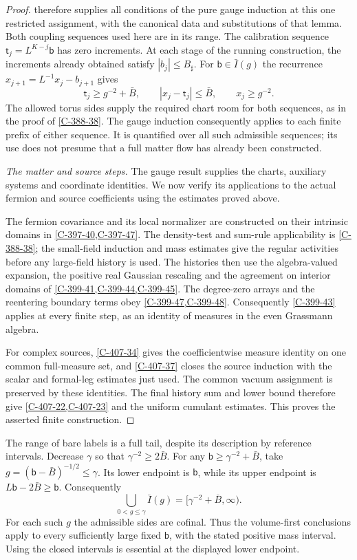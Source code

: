 \documentclass[11pt,letterpaper,reqno]{amsart}
\theoremstyle{definition}
\theoremstyle{remark}
\begin{document}
\begin{proof}
 therefore supplies all
conditions of the pure gauge induction at this one restricted
assignment, with the canonical data and substitutions of that
lemma. Both coupling sequences used here are in its
range. The calibration sequence
$\mathsf t_j=L^{K-j}\mathsf b$ has zero increments.
At each stage of the running construction, the increments
already obtained satisfy $|b_j|\le B_\sharp$. For
$\mathsf b\in\bar I(g)$ the recurrence
$x_{j+1}=L^{-1}x_j-b_{j+1}$ gives
\[
 \mathsf t_j\ge g^{-2}+\bar B,\qquad
 |x_j-\mathsf t_j|\le\bar B,\qquad x_j\ge g^{-2}.
\]
The allowed torus sides supply the required chart room for
both sequences, as in the proof of \cref{C-388-38}.
The gauge induction consequently applies to each finite
prefix of either sequence. It is quantified over all such
admissible sequences; its use does not presume that a full
matter flow has already been constructed.

\emph{The matter and source steps.}
The gauge result supplies the charts, auxiliary systems and
coordinate identities. We now verify its applications to
the actual fermion and source coefficients using the
estimates proved above.

The fermion covariance and its local normalizer are constructed
on their intrinsic domains in \cref{C-397-40,C-397-47}.
The density-test and sum-rule applicability is
\cref{C-388-38}; the small-field induction and mass estimates
give the regular activities before any large-field history
is used. The histories then use the algebra-valued expansion,
the positive real Gaussian rescaling and the agreement on
interior domains of \cref{C-399-41,C-399-44,C-399-45}.
The degree-zero arrays and the reentering boundary terms obey
\cref{C-399-47,C-399-48}. Consequently \cref{C-399-43}
applies at every finite step, as an identity of measures in
the even Grassmann algebra.

For complex sources, \cref{C-407-34} gives the coefficientwise
measure identity on one common full-measure set, and
\cref{C-407-37} closes the source induction with the scalar
and formal-leg estimates just used. The common vacuum
assignment is preserved by these identities. The final
history sum and lower bound therefore give
\cref{C-407-22,C-407-23} and the uniform cumulant estimates.
This proves the asserted finite construction.
\end{proof}

The range of bare labels is a full tail, despite its
description by reference intervals. Decrease $\gamma$ so
that $\gamma^{-2}\ge2\bar B$. For any
$\mathsf b\ge\gamma^{-2}+\bar B$, take
$g=(\mathsf b-\bar B)^{-1/2}\le\gamma$.
Its lower endpoint is $\mathsf b$, while its upper endpoint
is $L\mathsf b-2\bar B\ge\mathsf b$.
Consequently
\[
 \bigcup_{0<g\le\gamma}\bar I(g)
        =[\gamma^{-2}+\bar B,\infty).
\]
For each such $g$ the admissible sides are cofinal.
Thus the volume-first conclusions apply to every
sufficiently large fixed $\mathsf b$, with the stated
positive mass interval. Using the closed intervals is
essential at the displayed lower endpoint.
\end{document}
